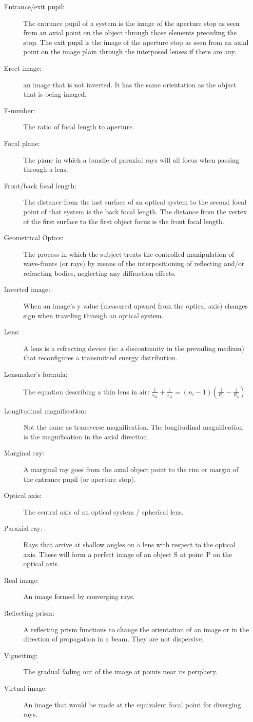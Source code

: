 \documentclass[12pt]{report}
\begin{document}
\begin{description}
\item[Entrance/exit pupil: ] The entrance pupil of a system is the image of the aperture stop as seen from an axial point on the object through those elements preceding the stop. The exit pupil is the image of the aperture stop as seen from an axial point on the image plain through the interposed lenses if there are any. 
\item[Erect image: ] an image that is not inverted. It has the same orientation as the object that is being imaged. 
\item[F-number: ] The ratio of focal length to aperture. 
\item[Focal plane: ] The plane in which a bundle of paraxial rays will all focus when passing through a lens. 
\item[Front/back focal length: ] The distance from the last surface of an optical system to the second focal point of that system is the back focal length. The distance from the vertex of the first surface to the first object focus is the front focal length. 
\item[Geometrical Optics: ] The process in which the subject treats the controlled manipulation of wave-fronts (or rays) by means of the interpositioning of reflecting and/or refracting bodies, neglecting any diffraction effects. 
\item[Inverted image: ] When an image's y value (measured upward from the optical axis) changes sign when traveling through an optical system. 
\item[Lens: ] A lens is a refracting device (ie: a discontinuity in the prevailing medium) that reconfigures a transmitted energy distribution.
\item[Lensmaker's formula: ] The equation describing a thin lens in air: $\frac{1}{s_{o1}}+\frac{1}{s_{i2}} = (n_i-1)\left(\frac{1}{R_1}-\frac{1}{R_2}\right) $
\item[Longitudinal magnification: ] Not the same as transverse magnification. The longitudinal magnification is the magnification in the axial direction. 
\item[Marginal ray: ] A marginal ray goes from the axial object point to the rim or margin of the entrance pupil (or aperture stop). 
\item[Optical axis: ] The central axis of an optical system / spherical lens.
\item[Paraxial ray: ] Rays that arrive at shallow angles on a lens with respect to the optical axis. These will form a perfect image of an object S at point P on the optical axis. 
\item[Real image: ] An image formed by converging rays. 
\item[Reflecting prism: ] A reflecting prism functions to change the orientation of an image or in the direction of propagation in a beam. They are not dispersive. 
\item[Vignetting: ] The gradual fading out of the image at points near its periphery. 
\item[Virtual image: ] An image that would be made at the equivalent focal point for diverging rays. 

\end{description}
\end{document}
